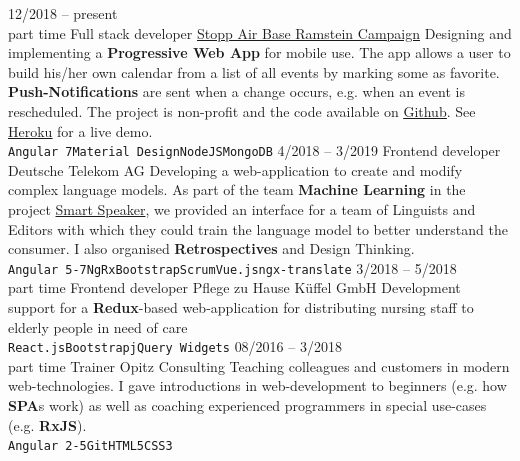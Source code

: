 \documentclass[9pt]{developercv} %
\begin{document}
\begin{entrylist}
	\entry
		{12/2018 -- present\\\footnotesize{part time}}
		{Full stack developer}
		{\href{https://www.ramstein-kampagne.eu/}{Stopp Air Base Ramstein Campaign}}
    {
      Designing and implementing a \textbf{Progressive Web App} for mobile use. The app allows a user to build his/her own calendar from
      a list of all events by marking some as favorite. \textbf{Push-Notifications} are sent when a change occurs, e.g. when an event is
      rescheduled. The project is non-profit and the code available on \uline{\href{https://github.com/frot-io/ramstein-conference-app}{Github}}.
      See \uline{\href{https://ramstein-conference-app.herokuapp.com/}{Heroku}} for a live demo.\\
      \texttt{Angular 7}\slashsep\texttt{Material Design}\slashsep\texttt{NodeJS}\slashsep\texttt{MongoDB}
    }
  \entry
		{4/2018 -- 3/2019}
		{Frontend developer}
		{Deutsche Telekom AG}
    {
      Developing a web-application to create and modify complex language models. As part of the team \textbf{Machine Learning} in the project
      \href{https://www.telekom.de/zuhause/geraete-und-zubehoer/smart-speaker}{Smart Speaker}, we provided an interface for a team
      of Linguists and Editors with which they could train the language model to better understand the consumer. I also organised
      \textbf{Retrospectives} and Design Thinking.\\
      \texttt{Angular 5-7}\slashsep\texttt{NgRx}\slashsep\texttt{Bootstrap}\slashsep\texttt{Scrum}\slashsep\texttt{Vue.js}\slashsep\texttt{ngx-translate}
    }
	\entry
		{3/2018 -- 5/2018\\\footnotesize{part time}}
		{Frontend developer}
		{Pflege zu Hause Küffel GmbH}
		{
      Development support for a \textbf{Redux}-based web-application for distributing nursing staff to elderly people in need of care\\
      \texttt{React.js}\slashsep\texttt{Bootstrap}\slashsep\texttt{jQuery Widgets}
    }
  \entry
		{08/2016 -- 3/2018\\\footnotesize{part time}}
		{Trainer}
		{Opitz Consulting}
		{
      Teaching colleagues and customers in modern web-technologies. I gave introductions in web-development to beginners (e.g. how \textbf{SPA}s work)
      as well as coaching experienced programmers in special use-cases (e.g. \textbf{RxJS}).\\
      \texttt{Angular 2-5}\slashsep\texttt{Git}\slashsep\texttt{HTML5}\slashsep\texttt{CSS3}
}
\end{entrylist}
\end{document}
